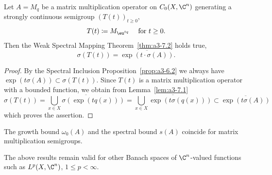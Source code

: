 \begin{theorem}\label{thm:a3-7.2}
Let $A = M_{q}$ be a matrix multiplication operator on $C_{0}(X,\C^{n})$ generating a strongly continuous semigroup $(T(t))_{t\geq 0}$, 
%
\[
	T(t) \coloneq M_{\eu^{ t q} } \quad \text{ for $t \geq 0$.}
\]
%
Then the Weak Spectral Mapping Theorem~\ref{thm:a3-7.2} holds true, \ie 
{}
\[
	\sigma(T(t)) = \overline{ \exp( t \cdot \sigma(A) ) } .
\]
\end{theorem}
\begin{proof}
By the Spectral Inclusion Proposition~\ref{prop:a3-6.2} we always have $\exp(t\sigma(A)) \subset \sigma(T(t))$.
Since $T(t)$ is a matrix multiplication operator with a bounded function, we obtain from Lemma~\ref{lem:a3-7.1}
\[
\sigma(T(t)) = \overline{\bigcup_{x\in X} \sigma(\exp(tq(x)))} = \overline{\bigcup_{x\in X} \exp(t\sigma(q(x)))} \subset \overline{\exp(t\sigma(A))}
\]
which proves the assertion.
\end{proof}
\begin{corollary}\label{cor:a3-7.3}
The growth bound $\omega_{0}(A)$ and the spectral bound $s(A)$ coincide for matrix multiplication semigroups.
\end{corollary}
The above results remain valid for other Banach spaces of\/ $\C^{n}$-valued functions such as $L^{p}(X,\C^{n})$, $1 \leq p < \infty$.

